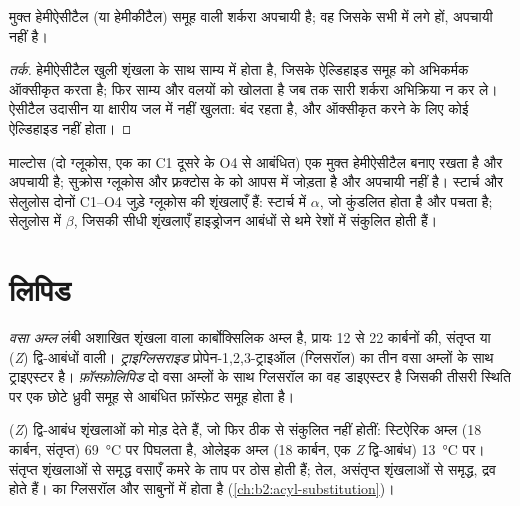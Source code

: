 \begin{proposition}[अपचायी या नहीं]\label{prop:b2:biomolecules:reducing}
मुक्त हेमीऐसीटैल (या हेमीकीटैल) समूह वाली शर्करा अपचायी है; वह  जिसके सभी 
 में लगे हों, अपचायी नहीं है।
\end{proposition}

\begin{proof}[तर्क]
हेमीऐसीटैल खुली शृंखला के साथ साम्य में होता है, जिसके ऐल्डिहाइड समूह को अभिकर्मक ऑक्सीकृत करता है;
फिर साम्य और वलयों को खोलता है जब तक सारी शर्करा अभिक्रिया न कर ले। ऐसीटैल
उदासीन या क्षारीय जल में नहीं खुलता:  बंद रहता है, और ऑक्सीकृत करने के लिए कोई ऐल्डिहाइड नहीं होता।
\end{proof}

माल्टोस (दो ग्लूकोस, एक का C1 दूसरे के O4 से आबंधित) एक मुक्त हेमीऐसीटैल बनाए रखता है और अपचायी है;
सुक्रोस ग्लूकोस और फ़्रक्टोस के  को आपस में जोड़ता है और अपचायी नहीं है। स्टार्च और
सेलुलोस दोनों C1--O4 जुड़े ग्लूकोस की शृंखलाएँ हैं: स्टार्च में $\alpha$, जो कुंडलित होता है और पचता है;
सेलुलोस में $\beta$, जिसकी सीधी शृंखलाएँ हाइड्रोजन आबंधों से थमे रेशों में संकुलित होती हैं।

\section{लिपिड}

\begin{definition}[लिपिड]\label{def:b2:biomolecules:lipid}
\emph{वसा अम्ल} लंबी अशाखित शृंखला वाला कार्बोक्सिलिक अम्ल है, प्रायः 12 से
22 कार्बनों की, संतृप्त या (\textit{Z}) द्वि-आबंधों वाली। \emph{ट्राइग्लिसराइड}
प्रोपेन-1,2,3-ट्राइऑल (ग्लिसरॉल) का तीन वसा अम्लों के साथ ट्राइएस्टर है।
\emph{फ़ॉस्फ़ोलिपिड} दो वसा अम्लों के साथ ग्लिसरॉल का वह डाइएस्टर है जिसकी तीसरी
स्थिति पर एक छोटे ध्रुवी समूह से आबंधित फ़ॉस्फ़ेट समूह होता है।
\end{definition}

(\textit{Z}) द्वि-आबंध शृंखलाओं को मोड़ देते हैं, जो फिर ठीक से संकुलित नहीं होतीं: स्टिऐरिक अम्ल (18 कार्बन,
संतृप्त) \qty{69}{\degreeCelsius} पर पिघलता है, ओलेइक अम्ल (18 कार्बन, एक \textit{Z} द्वि-आबंध)
\qty{13}{\degreeCelsius} पर। संतृप्त शृंखलाओं से समृद्ध वसाएँ कमरे के ताप पर ठोस होती हैं; तेल,
असंतृप्त शृंखलाओं से समृद्ध, द्रव होते हैं।  का  ग्लिसरॉल और साबुनों में होता है
(\cref{ch:b2:acyl-substitution})।

